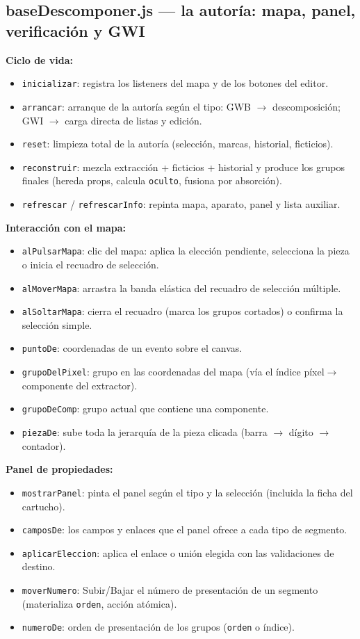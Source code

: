 \documentclass[../main.tex]{subfiles}
\begin{document}
	\subsection*{baseDescomponer.js — la autoría: mapa, panel, verificación y GWI}
	
	\textbf{Ciclo de vida:}
	\begin{itemize}
		\item \texttt{inicializar}: registra los listeners del mapa y de los
		botones del editor.
		\item \texttt{arrancar}: arranque de la autoría según el tipo:
		GWB $\rightarrow$ descomposición; GWI $\rightarrow$ carga directa de
		listas y edición.
		\item \texttt{reset}: limpieza total de la autoría (selección,
		marcas, historial, ficticios).
		\item \texttt{reconstruir}: mezcla extracción + ficticios +
		historial y produce los grupos finales (hereda props, calcula
		\texttt{oculto}, fusiona por absorción).
		\item \texttt{refrescar} / \texttt{refrescarInfo}: repinta mapa,
		aparato, panel y lista auxiliar.
	\end{itemize}
	
	\textbf{Interacción con el mapa:}
	\begin{itemize}
		\item \texttt{alPulsarMapa}: clic del mapa: aplica la elección
		pendiente, selecciona la pieza o inicia el recuadro de selección.
		\item \texttt{alMoverMapa}: arrastra la banda elástica del recuadro
		de selección múltiple.
		\item \texttt{alSoltarMapa}: cierra el recuadro (marca los grupos
		cortados) o confirma la selección simple.
		\item \texttt{puntoDe}: coordenadas de un evento sobre el canvas.
		\item \texttt{grupoDelPixel}: grupo en las coordenadas del mapa
		(vía el índice píxel$\rightarrow$componente del extractor).
		\item \texttt{grupoDeComp}: grupo actual que contiene una componente.
		\item \texttt{piezaDe}: sube toda la jerarquía de la pieza clicada
		(barra $\rightarrow$ dígito $\rightarrow$ contador).
	\end{itemize}
	
	\textbf{Panel de propiedades:}
	\begin{itemize}
		\item \texttt{mostrarPanel}: pinta el panel según el tipo y la
		selección (incluida la ficha del cartucho).
		\item \texttt{camposDe}: los campos y enlaces que el panel ofrece a
		cada tipo de segmento.
		\item \texttt{aplicarEleccion}: aplica el enlace o unión elegida con
		las validaciones de destino.
		\item \texttt{moverNumero}: Subir/Bajar el número de presentación de
		un segmento (materializa \texttt{orden}, acción atómica).
		\item \texttt{numeroDe}: orden de presentación de los grupos
		(\texttt{orden} o índice).
	\end{itemize}
	
\end{document}
